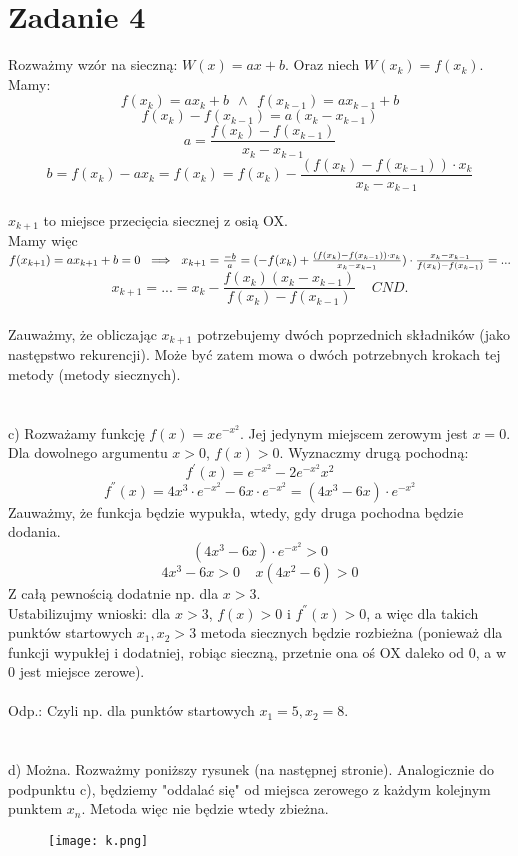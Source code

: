 \documentclass{article}
\begin{document}
\section*{Zadanie 4}
Rozważmy wzór na sieczną: $W(x) = ax + b$. Oraz niech $W(x_k) = f(x_k)$. Mamy:
$$f(x_k) = ax_k + b \ \ \wedge \ \ f(x_{k-1}) = ax_{k-1}+b$$
$$f(x_k) - f(x_{k-1}) = a(x_k - x_{k-1})$$
$$a = \frac{f(x_k) - f(x_{k-1})}{x_k - x_{k-1}}$$
$$b = f(x_k) - ax_k = f(x_k) = f(x_k) - \frac{(f(x_k) - f(x_{k-1})) \cdot x_k}{x_k - x_{k-1}}$$ \\
$x_{k+1}$ to miejsce przecięcia siecznej z osią OX. \\
Mamy więc $f(x_{k+1}) = ax_{k+1}+b = 0 \ \implies \ x_{k+1} = \frac{-b}{a} = (-f(x_k) + \frac{(f(x_k) - f(x_{k-1})) \cdot x_k}{x_k - x_{k-1}}) \cdot \frac{x_k - x_{k-1}}{f(x_k) - f(x_{k-1})} = ... \\$
$$x_{k+1} = ... = x_k - \frac{f(x_k)(x_k - x_{k-1})}{f(x_k)-f(x_{k-1})} \ \ \ \ \ CND.$$ \\
Zauważmy, że obliczając $x_{k+1}$ potrzebujemy dwóch poprzednich składników (jako następstwo rekurencji). Może być zatem mowa o dwóch potrzebnych krokach tej metody (metody siecznych). \\ \\ \\
c) Rozważamy funkcję $f(x) = xe^{-x^2}$. Jej jedynym miejscem zerowym jest $x = 0$. Dla dowolnego argumentu $x > 0$, $f(x) > 0$. Wyznaczmy drugą pochodną:
$$f^{'}(x) = e^{-x^2} - 2e^{-x^2}x^2$$
$$f^{''}(x) = 4x^3 \cdot e^{-x^2} - 6x \cdot e^{-x^2} = (4x^3 - 6x) \cdot e^{-x^2}$$
Zauważmy, że funkcja będzie wypukła, wtedy, gdy druga pochodna będzie dodania.
$$(4x^3 - 6x) \cdot e^{-x^2} > 0$$
$$4x^3 - 6x > 0 \ \ \ \ \ x(4x^2 - 6) > 0$$
Z całą pewnością dodatnie np. dla $x > 3$. \\
Ustabilizujmy wnioski: dla $x > 3$, $f(x) > 0$ i $f^{''}(x) > 0$, a więc dla takich punktów startowych $x_1, x_2 > 3$ metoda siecznych będzie rozbieżna (ponieważ dla funkcji wypukłej i dodatniej, robiąc sieczną, przetnie ona oś OX daleko od 0, a w 0 jest miejsce zerowe). \\ \\
Odp.: Czyli np. dla punktów startowych $x_1 = 5, x_2 = 8$. \\ \\ \\
d) Można. Rozważmy poniższy rysunek (na następnej stronie). Analogicznie do podpunktu c), będziemy "oddalać się" od miejsca zerowego z każdym kolejnym punktem $x_n$. Metoda więc nie będzie wtedy zbieżna.

\begin{figure}[H]
\centering
  \texttt{[image: k.png]}
\end{figure}
\end{document}
